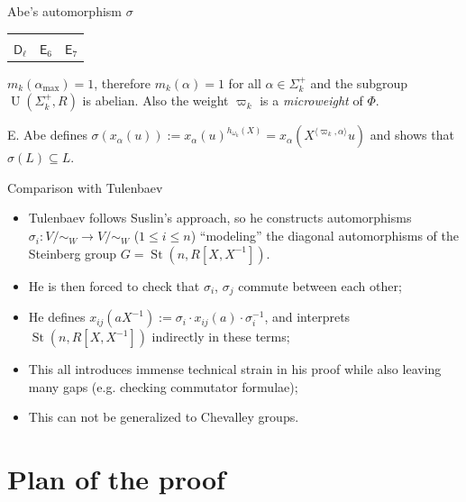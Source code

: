 \documentclass{beamer} %
\DeclareMathOperator{\St}{St}
\DeclareMathOperator{\UU}{U}
\theoremstyle{definition}
\begin{document}
\begin{frame}{Abe's automorphism $\sigma$}
\begin{tabular}{ccc}
{\begin{tikzpicture}
\node[levi, fit=(f1) (f2) (f3) (f4) (f5) (f6), label=above:{$\Delta$}] {};
\end{tikzpicture}}
\\[-0.2em]
$\mathsf{D}_\ell$ & $\mathsf{E}_6$ & $\mathsf{E}_7$
\end{tabular}
\medbreak
\pause

$m_k(\alpha_\mathrm{\max}) = 1$, therefore $m_k(\alpha) = 1$ for all $\alpha \in \Sigma_k^+$ and the subgroup $\UU(\Sigma^+_k, R)$ is abelian.
\pause
Also the weight $\varpi_k$ is a \textit{microweight} of $\Phi$.

\pause E. Abe defines $\sigma (x_\alpha(u)) := x_\alpha(u)^{h_{\omega_k}(X)} = x_\alpha(X^{\langle \varpi_k, \alpha \rangle}u)$ and shows that $\sigma(L) \subseteq L$.
\end{frame}

\begin{frame}{Comparison with Tulenbaev}
 \begin{itemize}
  \pause \item Tulenbaev follows Suslin's approach, so he constructs automorphisms $\sigma_i \colon V/\sim_W \to V/\sim_W$ ($1\leq i \leq n$) ``modeling'' the diagonal automorphisms of the Steinberg group $G = \St(n, R[X, X^{-1}])$.
  \pause \item He is then forced to check that $\sigma_i$, $\sigma_j$ commute between each other;
  \item He defines $x_{ij}(aX^{-1}) := \sigma_i \cdot x_{ij}(a) \cdot \sigma_i^{-1}$, and interprets $\St(n, R[X, X^{-1}])$ indirectly in these terms;
  \pause \item This all introduces immense technical strain in his proof while also leaving many gaps (e.g. checking commutator formulae);
  \pause \item This can not be generalized to Chevalley groups.
 \end{itemize}
\end{frame}

\section{Plan of the proof}
\begin{frame} \tableofcontents[currentsection] \end{frame}
\end{document}
